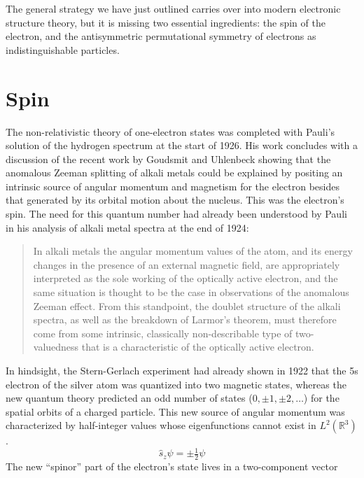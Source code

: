 The general strategy we have just outlined carries over into modern electronic
structure theory, but it is missing two essential ingredients: the spin of the
electron, and the antisymmetric permutational symmetry of electrons as
indistinguishable particles.


\section{Spin}

The non-relativistic theory of one-electron states was completed with Pauli's
solution of the hydrogen spectrum at the start of 1926.\cite{Pauli:1926p336}
His work concludes with a discussion of the recent work by Goudsmit and
Uhlenbeck\cite{Uhlenbeck:1925p953} showing that the anomalous Zeeman splitting
of alkali metals could be explained by positing an intrinsic source of angular
momentum and magnetism for the electron besides that generated by its orbital
motion about the nucleus.
This was the electron's spin.
The need for this quantum number had already been understood by Pauli in his
analysis of alkali metal spectra at the end of 1924:
\begin{quote}
    In alkali metals the angular momentum values of the atom, and its energy
    changes in the presence of an external magnetic field, are appropriately
    interpreted as the sole working of the optically active electron, and the
    same situation is thought to be the case in observations of the anomalous
    Zeeman effect.
    From this standpoint, the doublet structure of the alkali
    spectra, as well as the breakdown of Larmor's theorem, must
    therefore come from some intrinsic, classically non-describable
    type of two-valuedness that is a characteristic of the optically
    active electron.\cite{Pauli:1925p373}
\end{quote}
In hindsight, the Stern-Gerlach experiment\cite{Gerlach:1922p349} had already
shown in 1922 that the 5s electron of the silver atom was quantized into two
magnetic states, whereas the new quantum theory predicted an odd number of
states (\(0, \pm1, \pm2, \dots\)) for the spatial orbits of a charged particle.
This new source of angular momentum was characterized by half-integer values
whose eigenfunctions cannot exist in \(L^2(\mathbb{R}^3)\).
\begin{equation}
    \hat{s}_z
    \psi
    =
    \pm
    \tfrac{1}{2}
    \psi
\end{equation}
The new ``spinor'' part of the electron's state lives in a two-component vector
